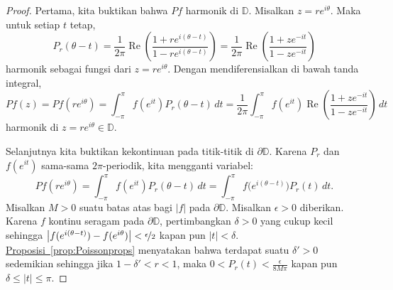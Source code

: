 \documentclass[12pt,openany]{book}
\renewcommand{\Re}{\operatorname{Re}}
\newcommand{\sabs}[1]{\lvert {#1} \rvert}
\newcommand{\babs}[1]{\bigl\lvert {#1} \bigr\rvert}
\newcommand{\D}{{\mathbb{D}}}
\theoremstyle{plain}
\theoremstyle{remark}
\theoremstyle{definition}
\theoremstyle{exercise}
\theoremstyle{example}
\newcommand{\propref}[1]{\hyperref[#1]{Proposisi~\ref*{#1}}}
\begin{document}
\begin{proof}
Pertama, kita buktikan bahwa $Pf$ harmonik di $\D$. Misalkan $z = re^{i\theta}$.
Maka untuk setiap $t$ tetap,
\begin{equation*}
P_r(\theta-t)
=
\frac{1}{2\pi}
\Re
\left(
\frac{1+re^{i(\theta-t)}}{1-re^{i(\theta-t)}}
\right)
=
\frac{1}{2\pi}
\Re
\left(
\frac{1+ze^{-it}}{1-ze^{-it}}
\right)
\end{equation*}
harmonik sebagai fungsi dari $z=re^{i\theta}$.
Dengan mendiferensialkan di bawah tanda integral,
\begin{equation*}
Pf(z)
=
Pf(re^{i\theta})
=
\int_{-\pi}^\pi f(e^{it}) P_r(\theta-t) \, dt
=
\frac{1}{2\pi}
\int_{-\pi}^\pi f(e^{it})
\Re
\left(
\frac{1+z e^{-it}}{1-z e^{-it}}
\right)
\, dt
\end{equation*}
harmonik di $z = re^{i\theta} \in \D$.

Selanjutnya kita buktikan kekontinuan pada titik-titik di $\partial \D$.
Karena $P_r$ dan $f(e^{it})$ sama-sama $2 \pi$-periodik, kita
mengganti variabel:
\begin{equation*}
Pf(re^{i\theta})
=
\int_{-\pi}^\pi f(e^{it}) P_r(\theta-t) \, dt
=
\int_{-\pi}^\pi f\bigl(e^{i(\theta-t)}\bigr) P_r(t) \, dt .
\end{equation*}
Misalkan $M > 0$ suatu batas atas bagi
$\sabs{f}$ pada $\partial \D$. Misalkan $\epsilon > 0$ diberikan.
Karena $f$ kontinu seragam pada $\partial \D$, pertimbangkan $\delta > 0$
yang cukup kecil sehingga $\babs{f(e^{i(\theta-t)})-f(e^{i\theta})} <
\nicefrac{\epsilon}{2}$ kapan pun $\sabs{t} < \delta$.
\propref{prop:Poissonprops} menyatakan bahwa terdapat
suatu $\delta' > 0$ sedemikian sehingga jika
$1-\delta' < r < 1$, maka
$0 < P_r(t) < \frac{\epsilon}{8M\pi}$
kapan pun $\delta \leq \sabs{t} \leq \pi$.


\end{proof}
\end{document}
